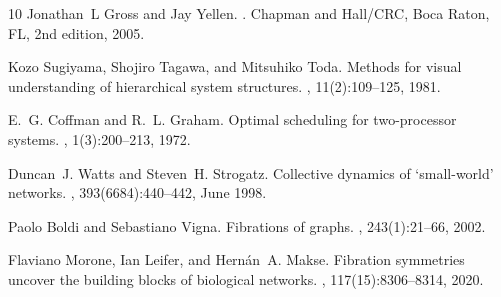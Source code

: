 \documentclass[11pt,a4paper]{article}
\begin{document}
\begin{thebibliography}{10}
Jonathan~L Gross and Jay Yellen.
.
\newblock Chapman and Hall/CRC, Boca Raton, FL, 2nd edition, 2005.

Kozo Sugiyama, Shojiro Tagawa, and Mitsuhiko Toda.
\newblock Methods for visual understanding of hierarchical system structures.
,
  11(2):109--125, 1981.

E.~G. Coffman and R.~L. Graham.
\newblock Optimal scheduling for two-processor systems.
, 1(3):200--213, 1972.

Duncan~J. Watts and Steven~H. Strogatz.
\newblock Collective dynamics of ‘small-world’ networks.
, 393(6684):440--442, June 1998.

Paolo Boldi and Sebastiano Vigna.
\newblock Fibrations of graphs.
, 243(1):21--66, 2002.

Flaviano Morone, Ian Leifer, and Hernán~A. Makse.
\newblock Fibration symmetries uncover the building blocks of biological
  networks.
,
  117(15):8306--8314, 2020.

\end{thebibliography}
\end{document}
